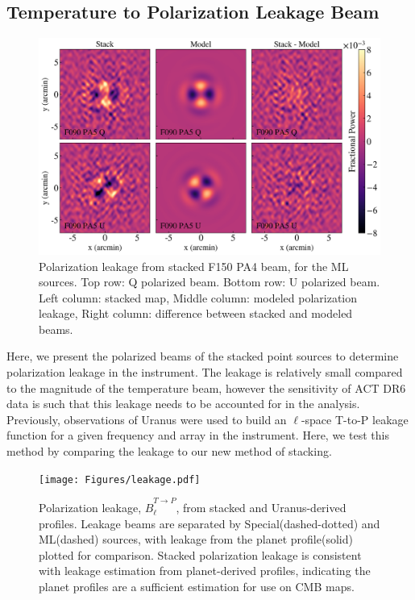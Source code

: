 \subsection{Temperature to Polarization Leakage Beam}
\label{subsec:polbeam}
\begin{figure}[t]
    \centering
    \includegraphics[width = \textwidth]{Figures/polbeams.png}
    \caption{Polarization leakage from stacked F150 PA4 beam, for the ML sources.  Top row: Q polarized beam.  Bottom row: U polarized beam. 
    Left column: stacked map, Middle column: modeled polarization leakage, Right column: difference between stacked and modeled beams.}
    \label{fig:polmodel}
\end{figure}
Here, we present the polarized beams of the stacked point sources to determine polarization leakage in the instrument.  The leakage is relatively small compared to the magnitude of the temperature beam, however the sensitivity of ACT DR6 data is such that this leakage needs to be accounted for in the analysis.  Previously, observations of Uranus were used to build an $\ell$-space T-to-P leakage function for a given frequency and array in the instrument.  Here, we test this method by comparing the leakage to our new method of stacking.

\begin{figure}[t]
    \centering
    \texttt{[image: Figures/leakage.pdf]}
    \caption{Polarization leakage, $B^{T\xrightarrow[]{}P}_{\ell}$, from stacked and Uranus-derived profiles.  Leakage beams are separated by Special(dashed-dotted) and ML(dashed) sources, with leakage from the planet profile(solid) plotted for comparison.  Stacked polarization leakage is consistent with leakage estimation from planet-derived profiles, indicating the planet profiles are a sufficient estimation for use on CMB maps.}
    \label{fig:leakage}
\end{figure}

